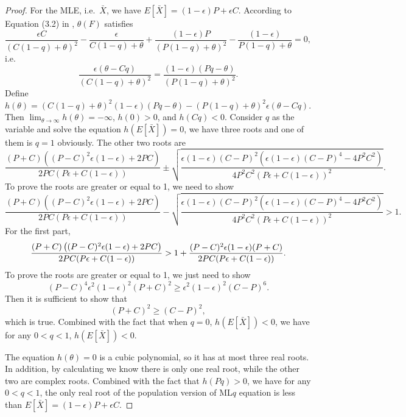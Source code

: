 \begin{proof}
For the MLE, i.e.\ $\bar{X}$, we have $E[\bar{X}] = (1-\epsilon) P + \epsilon C$.
According to Equation (3.2) in \citep{ferrari2010maximum}, $\theta(F)$ satisfies
\[
\frac{\epsilon C}{(C(1-q) + \theta)^2} - \frac{\epsilon}{C(1-q) + \theta}
+\frac{(1-\epsilon) P}{(P(1-q) + \theta)^2} - \frac{(1-\epsilon)}{P(1-q) + \theta}
= 0,
\]
i.e.\
\[
\frac{\epsilon (\theta - Cq)}{(C(1-q) + \theta)^2} =
\frac{(1-\epsilon) (P q - \theta)}{(P(1-q) + \theta)^2}.
\]
Define $h(\theta) = (C(1-q) + \theta)^2 (1-\epsilon) (P q - \theta) - (P(1-q) + \theta)^2 \epsilon (\theta - Cq)$.
Then $\lim_{\theta \to \infty}h(\theta) = -\infty$, $h(0) > 0$, and $h(Cq) < 0$.
Consider $q$ as the variable and solve the equation $h(E[\bar{X}]) = 0$, we have three roots and one of them is $q = 1$ obviously.
The other two roots are
\[
\frac{(P + C)\left( (P-C)^2 \epsilon(1-\epsilon) + 2PC \right)}{2PC(P \epsilon + C(1-\epsilon))}
\pm \sqrt{\frac{\epsilon(1-\epsilon)(C-P)^2\left(\epsilon(1-\epsilon)(C-P)^4 - 4P^2C^2\right)}{4 P^2 C^2 (P\epsilon + C(1-\epsilon))^2}}.
\]
To prove the roots are greater or equal to 1, we need to show
\[
\frac{(P + C)\left( (P-C)^2 \epsilon(1-\epsilon) + 2PC \right)}{2PC(P \epsilon + C(1-\epsilon))}
- \sqrt{\frac{\epsilon(1-\epsilon)(C-P)^2\left(\epsilon(1-\epsilon)(C-P)^4 - 4P^2C^2\right)}{4 P^2 C^2 (P\epsilon + C(1-\epsilon))^2}} > 1.
\]
For the first part,
\[
\frac{(P + C)\left( (P-C)^2 \epsilon(1-\epsilon) + 2PC \right)}{2PC(P \epsilon + C(1-\epsilon))}\\
> 1 + \frac{(P-C)^2 \epsilon (1-\epsilon) (P+C)}{2PC(P \epsilon + C(1-\epsilon))}.
\]
To prove the roots are greater or equal to 1, we just need to show
\[
(P-C)^4 \epsilon^2 (1-\epsilon)^2 (P+C)^2 \ge \epsilon^2(1-\epsilon)^2(C-P)^6.
\]
Then it is sufficient to show that
\[
(P+C)^2 \ge (C-P)^2,
\]
which is true.
Combined with the fact that when $q = 0$, $h(E[\bar{X}]) < 0$, we have for any $0 < q < 1$, $h(E[\bar{X}]) < 0$.

The equation $h(\theta) = 0$ is a cubic polynomial, so it has at most three real roots. In addition, by calculating we know there is only one real root, while the other two are complex roots. Combined with the fact that $h(P q) > 0$, we have for any $0 < q < 1$, the only real root of the population version of ML$q$ equation is less than $E[\bar{X}] = (1-\epsilon)P + \epsilon C$.
\end{proof}

